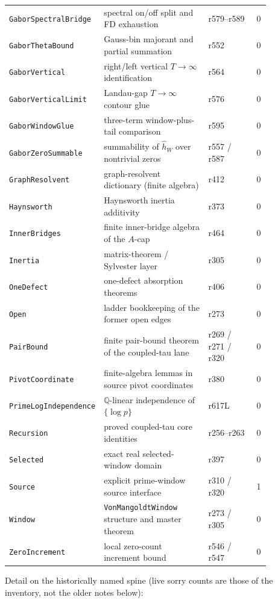\documentclass[11pt]{article}
\theoremstyle{definition}
\theoremstyle{remark}
\begin{document}
\begin{longtable}{@{}
  >{\raggedright\arraybackslash}p{0.28\linewidth}
  >{\raggedright\arraybackslash}p{0.40\linewidth}
  >{\raggedright\arraybackslash}p{0.18\linewidth}
  c@{}}
\texttt{GaborSpectralBridge} & spectral on/off split and FD exhaustion & r579--r589 & 0\\
\texttt{GaborThetaBound} & Gauss-bin majorant and partial summation & r552 & 0\\
\texttt{GaborVertical} & right/left vertical $T\to\infty$ identification & r564 & 0\\
\texttt{GaborVerticalLimit} & Landau-gap $T\to\infty$ contour glue & r576 & 0\\
\texttt{GaborWindowGlue} & three-term window-plus-tail comparison & r595 & 0\\
\texttt{GaborZeroSummable} & summability of $\hat h_W$ over nontrivial zeros & r557 / r587 & 0\\
\texttt{GraphResolvent} & graph-resolvent dictionary (finite algebra) & r412 & 0\\
\texttt{Haynsworth} & Haynsworth inertia additivity & r373 & 0\\
\texttt{InnerBridges} & finite inner-bridge algebra of the $A$-cap & r464 & 0\\
\texttt{Inertia} & matrix-theorem / Sylvester layer & r305 & 0\\
\texttt{OneDefect} & one-defect absorption theorems & r406 & 0\\
\texttt{Open} & ladder bookkeeping of the former open edges & r273 & 0\\
\texttt{PairBound} & finite pair-bound theorem of the coupled-tau lane & r269 / r271 / r320 & 0\\
\texttt{PivotCoordinate} & finite-algebra lemmas in source pivot coordinates & r380 & 0\\
\texttt{PrimeLogIndependence} & $\mathbb Q$-linear independence of $\{\log p\}$ & r617L & 0\\
\texttt{Recursion} & proved coupled-tau core identities & r256--r263 & 0\\
\texttt{Selected} & exact real selected-window domain & r397 & 0\\
\texttt{Source} & explicit prime-window source interface & r310 / r320 & 1\\
\texttt{Window} & \texttt{VonMangoldtWindow} structure and master theorem & r273 / r305 & 0\\
\texttt{ZeroIncrement} & local zero-count increment bound & r546 / r547 & 0\\
\bottomrule
\end{longtable}
\endgroup

\noindent Detail on the historically named spine (live sorry counts are
those of the inventory, not the older notes below):
\end{document}
